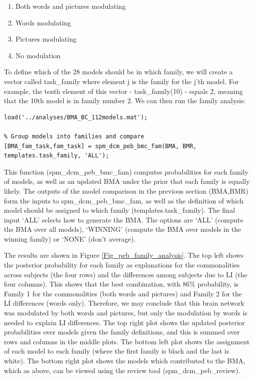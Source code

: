 \documentclass{article}
\begin{document}
\begin{enumerate}
    \item Both words and pictures modulating
    \item Words modulating
    \item Pictures modulating
    \item No modulation
\end{enumerate}

To define which of the 28 models should be in which family, we will create a vector called task\_family where element j is the family for the j'th model. For example, the tenth element of this vector - task\_family(10) - equals 2, meaning that the 10th model is in family number 2. We can then run the family analysis:

\begin{lstlisting}[style=Matlab-editor,caption=Family comparison]
% Load the result from the comparison of 28 reduced models
load('../analyses/BMA_BC_112models.mat');

% Group models into families and compare
[BMA_fam_task,fam_task] = spm_dcm_peb_bmc_fam(BMA, BMR, templates.task_family, 'ALL');
\end{lstlisting}

This function (spm\_dcm\_peb\_bmc\_fam) computes probabilities for each family of models, as well as an updated BMA under the prior that each family is equally likely. The outputs of the model comparison in the previous section (BMA,BMR) form the inputs to spm\_dcm\_peb\_bmc\_fam, as well as the definition of which model should be assigned to which family (templates.task\_family). The final input `ALL' selects how to generate the BMA. The options are `ALL' (compute the BMA over all models), `WINNING' (compute the BMA over models in the winning family) or `NONE' (don't average). 

The results are shown in Figure \ref{Fig_peb_family_analysis}. The top left shows the posterior probability for each family as explanations for the commonalities across subjects (the four rows) and the differences among subjects due to LI (the four columns). This shows that the best combination, with 86\% probability, is Family 1 for the commonalities (both words and pictures) and Family 2 for the LI differences (words only). Therefore, we may conclude that this brain network was modulated by both words and pictures, but only the modulation by words is needed to explain LI differences. The top right plot shows the updated posterior probabilities over models given the family definitions, and this is summed over rows and columns in the middle plots. The bottom left plot shows the assignment of each model to each family (where the first family is black and the last is white). The bottom right plot shows the models which contributed to the BMA, which as above, can be viewed using the review tool (spm\_dcm\_peb\_review).
\end{document}
